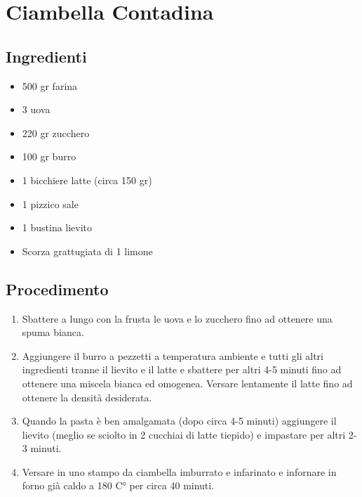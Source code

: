 \section{Ciambella Contadina}
\subsection{Ingredienti}
\begin{itemize}
\item 500 gr farina  
\item 3 uova  
\item 220 gr zucchero  
\item 100 gr burro  
\item 1 bicchiere latte (circa 150 gr)  
\item 1 pizzico sale  
\item 1 bustina lievito  
\item Scorza grattugiata di 1 limone
\end{itemize}
\subsection{Procedimento}
\begin{enumerate}
\item  Sbattere a lungo con la frusta le uova e lo zucchero fino ad ottenere una spuma bianca.   
\item  Aggiungere il burro a pezzetti a temperatura ambiente e tutti gli altri ingredienti tranne il lievito e il latte e sbattere per altri 4-5 minuti fino ad ottenere una miscela bianca ed omogenea. Versare lentamente il latte fino ad ottenere la densità desiderata.  
\item  Quando la pasta è ben amalgamata (dopo circa 4-5 minuti) aggiungere il lievito (meglio se sciolto in 2 cucchiai di latte tiepido) e impastare per altri 2-3 minuti.  
\item  Versare in uno stampo da ciambella imburrato e infarinato e infornare in forno già caldo a 180 C° per circa 40 minuti.
\end{enumerate}
